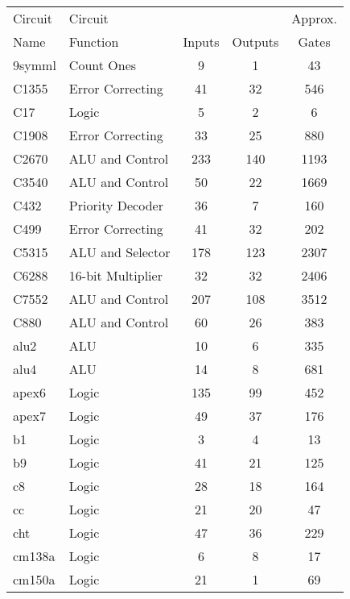 {\begin{pespace}
\begin{center}
\begin{tabular}{|l|l|c|c|c|} \hline

Circuit & Circuit          &        &         & Approx.      \\
Name    & Function         & Inputs & Outputs & Gates \\ \hline
9symml	& Count Ones       & 9      & 1       &    43 \\
C1355   & Error Correcting & 41     & 32      &   546 \\
C17     & Logic            & 5      & 2       &     6 \\
C1908   & Error Correcting & 33     & 25      &   880 \\
C2670   & ALU and Control  & 233    & 140     &  1193 \\
C3540   & ALU and Control  & 50     & 22      &  1669 \\
C432	& Priority Decoder & 36     & 7       &   160 \\
C499    & Error Correcting & 41     & 32      &   202 \\
C5315   & ALU and Selector & 178    & 123     &  2307 \\
C6288   & 16-bit Multiplier& 32     & 32      &  2406 \\
C7552   & ALU and Control  & 207    & 108     &  3512 \\
C880    & ALU and Control  & 60     & 26      &   383 \\
alu2    & ALU              & 10     & 6       &   335 \\
alu4    & ALU              & 14     & 8       &   681 \\
apex6   & Logic            & 135    & 99      &   452 \\
apex7   & Logic            & 49     & 37      &   176 \\ 
b1      & Logic            & 3      & 4       &    13 \\
b9      & Logic            & 41     & 21      &   125 \\
c8      & Logic            & 28     & 18      &   164 \\
cc      & Logic            & 21     & 20      &    47 \\
cht     & Logic            & 47     & 36      &   229 \\
cm138a  & Logic            & 6      & 8       &    17 \\
cm150a  & Logic            & 21     & 1       &    69 \\

\end{tabular}
\end{center}
\end{pespace}}
